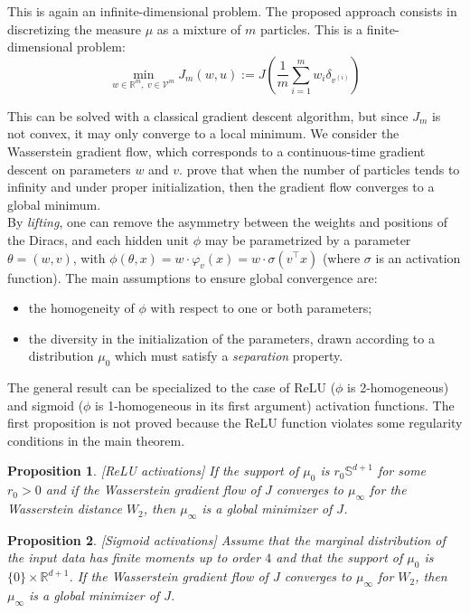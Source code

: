 \documentclass[a4paper, 11pt]{scrartcl}
\newtheorem{proposition}{Proposition}[section]
\begin{document}
{This is again an infinite-dimensional problem. The proposed approach consists in discretizing the measure $\mu$ as a mixture of $m$ particles. This is a finite-dimensional problem:
\begin{equation}
\min_{w \in \mathbb{R}^m,~v \in \mathcal{V}^m} J_m(w, u):=J\left(  \frac{1}{m} \sum_{i=1}^m w_i \delta_{v^{(i)}}\right)
\end{equation}

This can be solved with a classical gradient descent algorithm, but since $J_m$ is not convex, it may only converge to a local minimum. We consider the Wasserstein gradient flow, which corresponds to a continuous-time gradient descent on parameters $w$ and $v$. \cite{chizat2018global} prove that when the number of particles tends to infinity and under proper initialization, then the gradient flow converges to a global minimum.\\

By \textit{lifting}, one can remove the asymmetry between the weights and positions of the Diracs, and each hidden unit $\phi$ may be parametrized by a parameter $\theta = (w, v)$, with $\phi(\theta, x)=w \cdot \varphi_v(x) = w\cdot \sigma(v^\top x)$ (where $\sigma$ is an activation function). The main assumptions to ensure global convergence are:
\begin{itemize}
\item the homogeneity of $\phi$ with respect to one or both parameters;
\item the diversity in the initialization of the parameters, drawn according to a distribution $\mu_0$ which must satisfy a \textit{separation} property.\\
\end{itemize}

The general result can be specialized to the case of ReLU ($\phi$ is 2-homogeneous) and sigmoid ($\phi$ is 1-homogeneous in its first argument) activation functions. The first proposition is not proved because the ReLU function violates some regularity conditions in the main theorem.

\begin{proposition}
\emph{[ReLU activations]}
If the support of $\mu_0$ is $r_0 \mathbb{S}^{d+1}$ for some $r_0>0$ and if the Wasserstein gradient flow of $J$ converges to $\mu_\infty$ for the Wasserstein distance $W_2$, then $\mu_\infty$ is a global minimizer of $J$.
\end{proposition}

\begin{proposition}
\emph{[Sigmoid activations]}
Assume that the marginal distribution of the input data has finite moments up to order $4$ and that the support of $\mu_0$ is $\{0\} \times \mathbb{R}^{d+1}$. If the Wasserstein gradient flow of $J$ converges to $\mu_\infty$ for $W_2$, then $\mu_\infty$ is a global minimizer of $J$.
\end{proposition}

}
\end{document}
